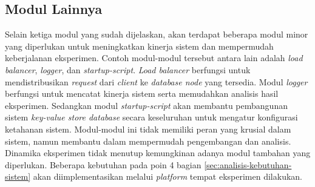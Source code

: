 \subsection{Modul Lainnya}
Selain ketiga modul yang sudah dijelaskan, akan terdapat beberapa modul minor yang diperlukan untuk meningkatkan kinerja sistem dan mempermudah keberjalanan eksperimen. Contoh modul-modul tersebut antara lain adalah \textit{load balancer}, \textit{logger}, dan \textit{startup-script}. \textit{Load balancer} berfungsi untuk mendistribusikan \textit{request} dari \textit{client} ke \textit{database node} yang tersedia. Modul \textit{logger} berfungsi untuk mencatat kinerja sistem serta memudahkan analisis hasil eksperimen. Sedangkan modul \textit{startup-script} akan membantu pembangunan sistem \textit{key-value store database} secara keseluruhan untuk mengatur konfigurasi ketahanan sistem. Modul-modul ini tidak memiliki peran yang krusial dalam sistem, namun membantu dalam mempermudah pengembangan dan analisis. Dinamika eksperimen tidak menutup kemungkinan adanya modul tambahan yang diperlukan. Beberapa kebutuhan pada poin 4 bagian \ref{sec:analisis-kebutuhan-sistem} akan diimplementasikan melalui \textit{platform} tempat eksperimen dilakukan.
